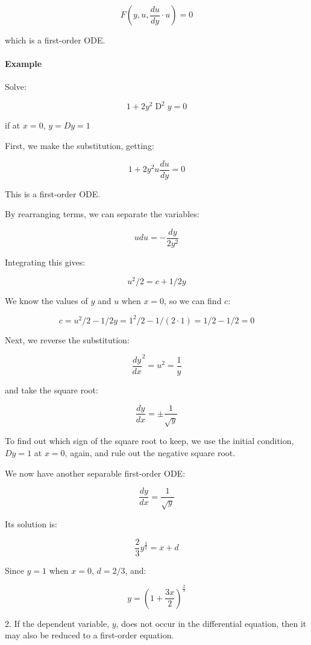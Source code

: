 $$F\left(y,u,\frac{du}{dy} \cdot u\right) = 0$$

which is a first-order ODE.



\paragraph{Example}

Solve:

$$1 + 2y^2\operatorname{D}^2y = 0$$

if at $x = 0$, $y = D y = 1$



First, we make the substitution, getting:

$$1 + 2y^2 u \frac{du}{dy} = 0$$

This is a first-order ODE.

By rearranging terms, we can separate the variables:

$$udu = -\frac{dy}{2y^2}$$

Integrating this gives:

$$u^2/2 = c + 1/2y$$

We know the values of $y$ and $u$ when $x = 0$, so we can find $c$:

$$c = u^2/2 - 1/2y = 1^2/2 - 1/(2 \cdot 1) = 1/2 - 1/2 = 0$$

Next, we reverse the substitution:

$$\frac{dy}{dx}^2 = u^2 = \frac{1}{y}$$

and take the square root:

$$\frac{dy}{dx} = \pm \frac{1}{\sqrt{y}}$$

To find out which sign of the square root to keep, we use the initial condition, $D y = 1$ at $x = 0$, again, and rule out the negative square root.

We now have another separable first-order ODE:

$$\frac{dy}{dx} = \frac{1}{\sqrt{y}}$$

Its solution is:

$$\frac{2}{3}y^{\frac{3}{2}} = x + d$$

Since $y = 1$ when $x = 0$, $d = 2/3$, and:

$$y = \left(1 + \frac{3x}{2} \right)^{\frac{2}{3}}$$



2.  If the dependent variable, $y$, does not occur in the differential equation, then it may also be reduced to a first-order equation.



